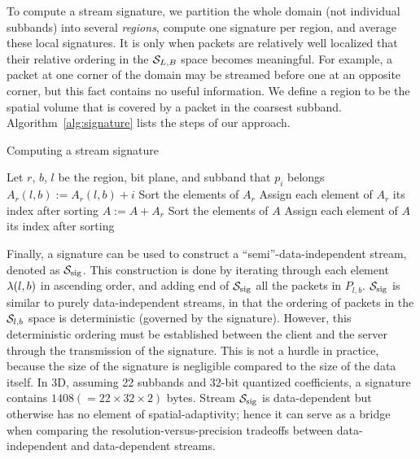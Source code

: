To compute a stream signature, we partition the whole domain (not individual subbands) into several
\emph{regions}, compute one signature per region, and average these local signatures. It is only
when packets are relatively well localized that their relative ordering in the $\strm_{L,B}$ space
becomes meaningful. For example, a packet at one corner of the domain may be streamed before one at
an opposite corner, but this fact contains no useful information. We define a region to be the
spatial volume that is covered by a packet in the coarsest subband. Algorithm~\ref{alg:signature}
lists the steps of our approach.

\begin{algorithm}[h]
  \caption{Computing a stream signature}
  \begin{algorithmic}[1]
			\State Let $r$, $b$, $l$ be the region, bit plane, and subband that $p_i$ belongs
			\State $A_r(l,b) := A_r(l,b)+i$
		\EndFor
			\State Sort the elements of $A_r$
			\State Assign each element of $A_r$ its index after sorting
			\State $A := A+A_r$
		\EndFor
		\State Sort the elements of $A$
		\State Assign each element of $A$ its index after sorting
	\end{algorithmic}
	\label{alg:signature}
\end{algorithm}

Finally, a signature can be used to construct a ``semi''-data-independent stream, denoted as
$\ssig$. This construction is done by iterating through each element $\sgn(l,b)$ in ascending order,
and adding end of $\ssig$ all the packets in $P_{l,b}$. $\ssig$ is similar to purely
data-independent streams, in that the ordering of packets in the $\strm_{l,b}$ space is
deterministic (governed by the signature). However, this deterministic ordering must be established
between the client and the server through the transmission of the signature. This is not a hurdle in
practice, because the size of the signature is negligible compared to the size of the data itself.
In 3D, assuming 22 subbands and 32-bit quantized coefficients, a signature contains $1408 (=22\times
32\times 2)$ bytes. Stream $\ssig$ is data-dependent but otherwise has no element of
spatial-adaptivity; hence it can serve as a bridge when comparing the resolution-versus-precision
tradeoffs between data-independent and data-dependent streams.

